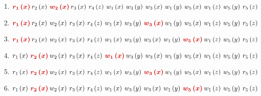 \documentclass[a4paper]{article}
\begin{document}
	\begin{enumerate}
		\item $\textcolor{Red3}{\boldsymbol{r_{1}\left(x\right)} \: }r_{2}\left(x\right) \: \textcolor{Red3}{\boldsymbol{w_{2}\left(x\right)} \: }r_{3}\left(x\right) \: r_{4}\left(z\right) \: w_{1}\left(x\right) \: w_{3}\left(y\right) \: w_{3}\left(x\right) \: w_{1}\left(y\right) \: w_{5}\left(x\right) \: w_{1}\left(z\right) \: w_{5}\left(y\right) \: r_{5}\left(z\right)$
		
		\item $\textcolor{Red3}{\boldsymbol{r_{1}\left(x\right)} \: }r_{2}\left(x\right) \: w_{2}\left(x\right) \: r_{3}\left(x\right) \: r_{4}\left(z\right) \: w_{1}\left(x\right) \: w_{3}\left(y\right) \: \textcolor{Red3}{\boldsymbol{w_{3}\left(x\right)} \: }w_{1}\left(y\right) \: w_{5}\left(x\right) \: w_{1}\left(z\right) \: w_{5}\left(y\right) \: r_{5}\left(z\right)$
		
		\item $\textcolor{Red3}{\boldsymbol{r_{1}\left(x\right)} \: }r_{2}\left(x\right) \: w_{2}\left(x\right) \: r_{3}\left(x\right) \: r_{4}\left(z\right) \: w_{1}\left(x\right) \: w_{3}\left(y\right) \: w_{3}\left(x\right) \: w_{1}\left(y\right) \: \textcolor{Red3}{\boldsymbol{w_{5}\left(x\right)} \: }w_{1}\left(z\right) \: w_{5}\left(y\right) \: r_{5}\left(z\right)$
		
		\item $r_{1}\left(x\right) \: \textcolor{Red3}{\boldsymbol{r_{2}\left(x\right)} \: }w_{2}\left(x\right) \: r_{3}\left(x\right) \: r_{4}\left(z\right) \: \textcolor{Red3}{\boldsymbol{w_{1}\left(x\right)} \: }w_{3}\left(y\right) \: w_{3}\left(x\right) \: w_{1}\left(y\right) \: w_{5}\left(x\right) \: w_{1}\left(z\right) \: w_{5}\left(y\right) \: r_{5}\left(z\right)$
		
		\item $r_{1}\left(x\right) \: \textcolor{Red3}{\boldsymbol{r_{2}\left(x\right)} \: }w_{2}\left(x\right) \: r_{3}\left(x\right) \: r_{4}\left(z\right) \: w_{1}\left(x\right) \: w_{3}\left(y\right) \: \textcolor{Red3}{\boldsymbol{w_{3}\left(x\right)} \: }w_{1}\left(y\right) \: w_{5}\left(x\right) \: w_{1}\left(z\right) \: w_{5}\left(y\right) \: r_{5}\left(z\right)$
		
		\item $r_{1}\left(x\right) \: \textcolor{Red3}{\boldsymbol{r_{2}\left(x\right)} \: }w_{2}\left(x\right) \: r_{3}\left(x\right) \: r_{4}\left(z\right) \: w_{1}\left(x\right) \: w_{3}\left(y\right) \: w_{3}\left(x\right) \: w_{1}\left(y\right) \: \textcolor{Red3}{\boldsymbol{w_{5}\left(x\right)} \: }w_{1}\left(z\right) \: w_{5}\left(y\right) \: r_{5}\left(z\right)$
		

\end{enumerate}
\end{document}
